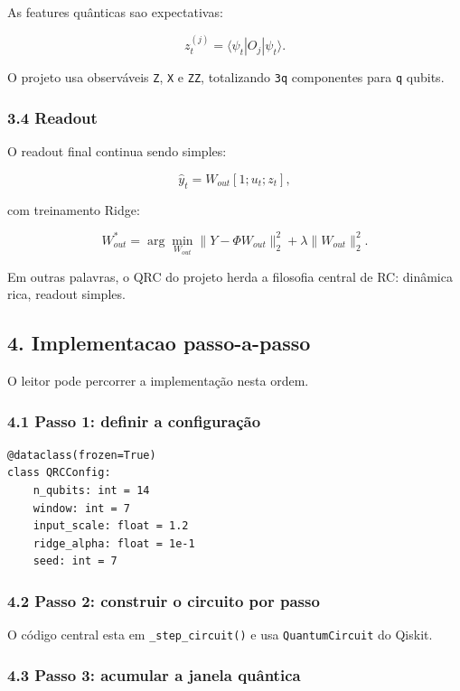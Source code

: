 \documentclass[12pt]{article}
\begin{document}
As features quânticas sao expectativas:

\[
z_t^{(j)} = \langle \psi_t | O_j | \psi_t \rangle.
\]

O projeto usa observáveis \texttt{Z}, \texttt{X} e \texttt{ZZ}, totalizando \texttt{3q} componentes para \texttt{q} qubits.

\subsubsection{3.4 Readout}\label{34-readout}

O readout final continua sendo simples:

\[
\hat{y}_t = W_{out} [1; u_t; z_t],
\]

com treinamento Ridge:

\[
W_{out}^* = \arg\min_{W_{out}} \|Y - \Phi W_{out}\|_2^2 + \lambda \|W_{out}\|_2^2.
\]

Em outras palavras, o QRC do projeto herda a filosofia central de RC: dinâmica rica, readout simples.

\subsection{4. Implementacao passo-a-passo}\label{4-implementacao-passo-a-passo}

O leitor pode percorrer a implementação nesta ordem.

\subsubsection{4.1 Passo 1: definir a configuração}\label{41-passo-1-definir-a-configurauxe7uxe3o}

\begin{verbatim}
@dataclass(frozen=True)
class QRCConfig:
    n_qubits: int = 14
    window: int = 7
    input_scale: float = 1.2
    ridge_alpha: float = 1e-1
    seed: int = 7
\end{verbatim}

\subsubsection{4.2 Passo 2: construir o circuito por passo}\label{42-passo-2-construir-o-circuito-por-passo}

O código central esta em \texttt{\_step\_circuit()} e usa \texttt{QuantumCircuit} do Qiskit.

\subsubsection{4.3 Passo 3: acumular a janela quântica}\label{43-passo-3-acumular-a-janela-quuxe2ntica}
\end{document}

